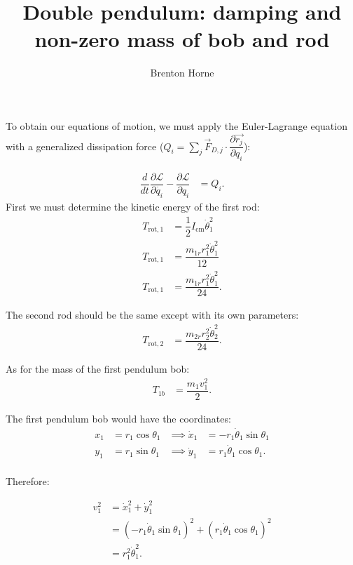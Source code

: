 \documentclass[12pt,a4paper,landscape]{article}
\date{}
\title{Double pendulum: damping and non-zero mass of bob and rod}
\author{Brenton Horne}
\begin{document}
	\maketitle
	
	To obtain our equations of motion, we must apply the Euler-Lagrange equation with a generalized dissipation force ($Q_i = \sum_j \vec{F}_{D,j} \cdot \dfrac{\partial \vec{r_j}}{\partial q_i}$):
	
	\begin{align}
		\dfrac{d}{dt}\dfrac{\partial \mathcal{L}}{\partial \dot{q_i}} - \dfrac{\partial \mathcal{L}}{\partial q_i} &= Q_i. \label{ELD}
	\end{align}
	First we must determine the kinetic energy of the first rod:
	\begin{align*}
		T_{\mathrm{rot}, 1} &= \dfrac{1}{2} I_{\mathrm{cm}} \dot{\theta}_1^2 \\
		T_{\mathrm{rot}, 1} &= \dfrac{m_{1r} r_1^2\dot{\theta}_1^2}{12} \\
		T_{\mathrm{rot}, 1} &= \dfrac{m_{1r} r_1^2\dot{\theta}_1^2}{24}.
	\end{align*}
	
	The second rod should be the same except with its own parameters:
	\begin{align*}
		T_{\mathrm{rot}, 2} &= \dfrac{m_{2r} r_2^2\dot{\theta}_2^2}{24}.
	\end{align*}
	
	As for the mass of the first pendulum bob:
	\begin{align*}
		T_{1b} &= \dfrac{m_1v_1^2}{2}.
	\end{align*}
	
	The first pendulum bob would have the coordinates:
	\begin{align*}
		x_1 &= r_1 \cos{\theta_1} &\implies \dot{x}_1 &= -r_1\dot{\theta}_1 \sin{\theta_1}\\
		y_1 &= r_1 \sin{\theta_1} &\implies \dot{y}_1 &= r_1 \dot{\theta}_1 \cos{\theta_1}. \\
	\end{align*}
	
	Therefore:
	
	\begin{align*}
		v_1^2 &= \dot{x}_1^2 + \dot{y}_1^2 \\
		&= \left(-r_1\dot{\theta}_1 \sin{\theta_1}\right)^2 + \left(r_1 \dot{\theta}_1 \cos{\theta_1}\right)^2 \\
		&= r_1^2 \dot{\theta}_1^2.
	\end{align*}
	
\end{document}
